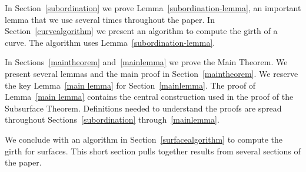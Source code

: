 In Section~\ref{subordination} we prove Lemma~\ref{subordination-lemma}, an important lemma that we use several times throughout the paper.
In Section~\ref{curvealgorithm} we present an algorithm 
to compute the girth of a curve.  The algorithm uses Lemma~\ref{subordination-lemma}.

In Sections~\ref{maintheorem} and~\ref{mainlemma} we prove 
the Main Theorem.  We present several lemmas and the 
main proof in Section~\ref{maintheorem}.  We reserve the 
key Lemma~\ref{main lemma} for Section~\ref{mainlemma}.
The proof of Lemma~\ref{main lemma} contains the central construction 
used in the proof of the Subsurface Theorem.
Definitions needed to understand the proofs are spread throughout 
Sections~\ref{subordination} through~\ref{mainlemma}.

We conclude with an algorithm in Section~\ref{surfacealgorithm} to compute the girth for surfaces.  This short section pulls together results from several sections of the paper.